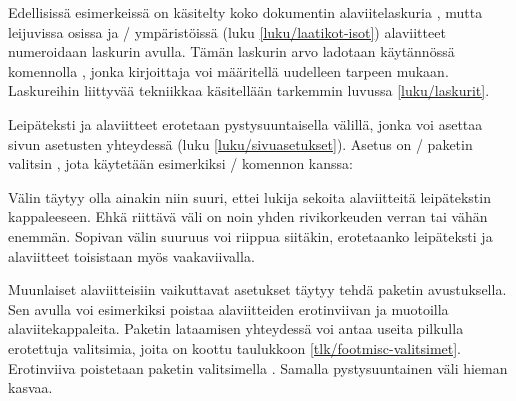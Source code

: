 \noindent
Edellisissä esimerkeissä on käsitelty koko dokumentin alaviitelaskuria
, mutta leijuvissa osissa ja \-/
ympäristöissä (luku \ref{luku/laatikot-isot}) alaviitteet numeroidaan
laskurin  avulla. Tämän laskurin arvo ladotaan
käytännössä komennolla , jonka kirjoittaja voi
määritellä uudelleen tarpeen mukaan. Laskureihin liittyvää tekniikkaa
käsitellään tarkemmin luvussa \ref{luku/laskurit}.

Leipäteksti ja alaviitteet erotetaan pystysuuntaisella välillä, jonka
voi asettaa sivun asetusten yhteydessä (luku \ref{luku/sivuasetukset}).
Asetus on \-/ paketin valitsin ,
jota käytetään esimerkiksi \-/ komennon kanssa:

\begin{koodilohkosis}
\geometry{ footnotesep=14bp }
\end{koodilohkosis}

\noindent
Välin täytyy olla ainakin niin suuri, ettei lukija sekoita alaviitteitä
leipätekstin kappaleeseen. Ehkä riittävä väli on noin yhden
rivikorkeuden verran tai vähän enemmän. Sopivan välin suuruus voi
riippua siitäkin, erotetaanko leipäteksti ja alaviitteet toisistaan myös
vaakaviivalla.

Muunlaiset alaviitteisiin vaikuttavat asetukset täytyy tehdä paketin
 avustuksella. Sen avulla voi esimerkiksi poistaa
alaviitteiden erotinviivan ja muotoilla alaviitekappaleita. Paketin
lataamisen yhteydessä voi antaa useita pilkulla erotettuja valitsimia,
joita on koottu taulukkoon \ref{tlk/footmisc-valitsimet}. Erotinviiva
poistetaan paketin valitsimella . Samalla pystysuuntainen
väli hieman kasvaa.


